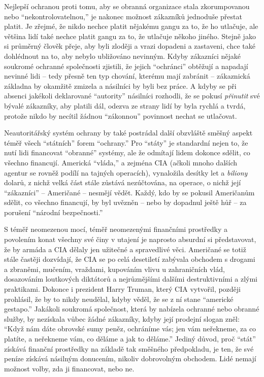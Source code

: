 \documentclass{book}
\begin{document}
Nejlepší ochranou proti tomu, aby se obranná organizace stala zkorumpovanou nebo \enquote{nekontrolovatelnou,} je nakonec možnost zákazníků jednoduše přestat platit. Je zřejmé, že nikdo nechce platit nějakému gangu za to, že ho utlačuje, ale většina lidí také nechce platit gangu za to, že utlačuje někoho jiného. Stejně jako si průměrný člověk přeje, aby byli zloději a vrazi dopadeni a zastaveni, chce také dohlédnout na to, aby nebylo ubližováno nevinným. Kdyby zákazníci nějaké soukromé ochranné společnosti zjistili, že jejich \enquote{ochránci} obtěžují a napadají nevinné lidi -- tedy přesně ten typ chování, kterému mají zabránit -- zákaznická základna by okamžitě zmizela a násilníci by byli bez práce. A kdyby se při absenci jakékoli deklarované \enquote{autority} násilníci rozhodli, že se pokusí \emph{přinutit} své bývalé zákazníky, aby platili dál, odezva ze strany lidí by byla rychlá a tvrdá, protože nikdo by necítil žádnou \enquote{zákonnou} povinnost nechat se utlačovat.

Neautoritářský systém ochrany by také postrádal další obzvláště směšný aspekt téměř všech \enquote{státních} forem \enquote{ochrany.} Pro \enquote{státy} je standardní nejen to, že nutí lidi financovat \enquote{obranné} systémy, ale že odmítají lidem dokonce sdělit, co všechno financují. Americká \enquote{vláda,} a zejména CIA (ačkoli mnoho dalších agentur se rovněž podílí na tajných operacích), vynaložila desítky let a \emph{biliony} dolarů, z nichž velká část stále zůstává nezúčtována, na operace, o nichž její \enquote{zákazníci} -- Američané -- nesmějí vědět. Každý, kdo by se pokusil Američanům sdělit, co všechno financují, by byl uvězněn -- nebo by dopadnul ještě hůř -- za porušení \enquote{národní bezpečnosti.}

S téměř neomezenou mocí, téměř neomezenými finančními prostředky a povolením konat všechny své činy v utajení je naprosto absurdní si představovat, že by armáda a CIA dělaly jen užitečné a spravedlivé věci. Američané se totiž stále častěji dozvídají, že CIA se po celá desetiletí zabývala obchodem s drogami a zbraněmi, mučením, vraždami, kupováním vlivu u zahraničních vlád, dosazováním loutkových diktátorů a nejrůznějšími dalšími destruktivními a zlými praktikami. Dokonce i prezident Harry Truman, který CIA vytvořil, později prohlásil, že by to nikdy neudělal, kdyby věděl, že se z ní stane \enquote{americké gestapo.} Jakákoli soukromá společnost, která by nabízela ochranné nebo obranné služby, by nezískala vůbec žádné zákazníky, kdyby její prodejní slogan zněl: \enquote{Když nám dáte obrovské sumy peněz, ochráníme vás; jen vám neřekneme, za co platíte, a neřekneme vám, co děláme a jak to děláme.} Jediný důvod, proč \enquote{stát} získává finanční prostředky na základě tak směšného předpokladu, je ten, že své peníze získává násilným donucením, nikoliv dobrovolným obchodem. Lidé nemají možnost volby, zda ji financovat, nebo ne.
\end{document}
